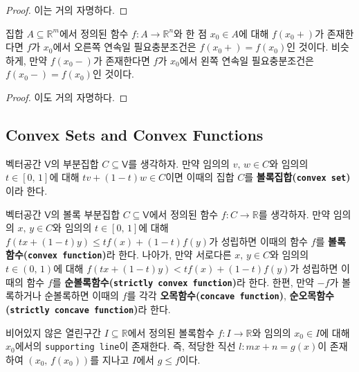 \begin{proof}
    이는 거의 자명하다.
\end{proof}

\begin{proposition}
    집합 $A\subseteq\mathbb{R}^m$에서 정의된 함수 $f:A\to\mathbb{R}^n$와 한 점 $x_0\in A$에 대해 $f(x_0+)$가 존재한다면 $f$가 $x_0$에서 오른쪽 연속일 필요충분조건은 $f(x_0+)=f(x_0)$인 것이다. 비슷하게, 만약 $f(x_0-)$가 존재한다면 $f$가 $x_0$에서 왼쪽 연속일 필요충분조건은 $f(x_0-)=f(x_0)$인 것이다.
\end{proposition}

\begin{proof}
    이도 거의 자명하다.
\end{proof}

\subsection{Convex Sets and Convex Functions}

\begin{definition}
    벡터공간 $\mathsf{V}$의 부분집합 $C\subseteq\mathsf{V}$를 생각하자. 만약 임의의 $v,\,w\in C$와 임의의 $t\in[0,\,1]$에 대해 $tv+(1-t)w\in C$이면 이때의 집합 $C$를 \textbf{볼록집합(\texttt{convex set})}이라 한다.
\end{definition}

\begin{definition}
    벡터공간 $\mathsf{V}$의 볼록 부분집합 $C\subseteq\mathsf{V}$에서 정의된 함수 $f:C\to\mathbb{R}$를 생각하자. 만약 임의의 $x,\,y\in C$와 임의의 $t\in[0,\,1]$에 대해 $f(tx+(1-t)y)\leq tf(x)+(1-t)f(y)$가 성립하면 이때의 함수 $f$를 \textbf{볼록함수(\texttt{convex function})}라 한다. 나아가, 만약 서로다른 $x,\,y\in C$와 임의의 $t\in(0,\,1)$에 대해 $f(tx+(1-t)y)<tf(x)+(1-t)f(y)$가 성립하면 이때의 함수 $f$를 \textbf{순볼록함수(\texttt{strictly convex function})}라 한다. 한편, 만약 $-f$가 볼록하거나 순볼록하면 이때의 $f$를 각각 \textbf{오목함수(\texttt{concave function})}, \textbf{순오목함수(\texttt{strictly concave function})}라 한다.
\end{definition}

\begin{theorem}
    비어있지 않은 열린구간 $I\subseteq\mathbb{R}$에서 정의된 볼록함수 $f:I\to\mathbb{R}$와 임의의 $x_0\in I$에 대해 $x_0$에서의 \texttt{supporting line}이 존재한다. 즉, 적당한 직선 $l:mx+n=g(x)$이 존재하여 $(x_0,\,f(x_0))$를 지나고 $I$에서 $g\leq f$이다.
\end{theorem}

